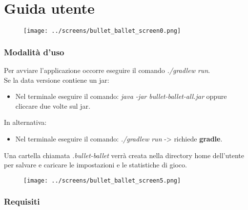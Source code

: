 
\appendix
\chapter{Guida utente}

\begin{figure}[H]
	\centering{}
	\texttt{[image: ../screens/bullet\_ballet\_screen0.png]}
	\label{img:bullet_ballet_screen0}
\end{figure}

\subsection{Modalità d'uso}

\textsf{\small Per avviare l'applicazione occorre eseguire il comando \emph{./gradlew run}.} \\

\textsf{\small Se la data versione contiene un jar: } \\

\begin{itemize}
	\item \textsf{\small Nel terminale eseguire il comando: \emph{java -jar bullet-ballet-all.jar} oppure cliccare due volte sul jar.}
\end{itemize}

\textsf{\small In alternativa: } \\

\begin{itemize}
	\item \textsf{\small Nel terminale eseguire il comando: \emph{./gradlew run} -> richiede \textbf{gradle}.}
\end{itemize}

\textsf{\small Una cartella chiamata \emph{.bullet-ballet} verrà creata nella directory home dell'utente per salvare e caricare le impostazioni e le statistiche di gioco.} \\

\begin{figure}[H]
	\centering{}
	\texttt{[image: ../screens/bullet\_ballet\_screen5.png]}
	\label{img:bullet_ballet_screen5}
\end{figure}

\subsection{Requisiti}

